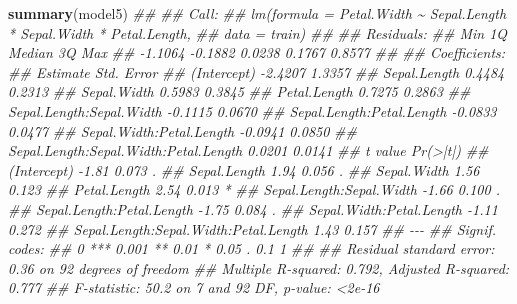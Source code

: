 \documentclass[
  notitlepage]{book}
\newenvironment{Shaded}{\begin{snugshade}}{\end{snugshade}}
\newcommand{\CommentTok}[1]{\textcolor[rgb]{0.56,0.35,0.01}{\textit{#1}}}
\newcommand{\KeywordTok}[1]{\textcolor[rgb]{0.13,0.29,0.53}{\textbf{#1}}}
\newcommand{\NormalTok}[1]{#1}
\begin{document}
\begin{Shaded}
\begin{Highlighting}[]
\KeywordTok{summary}\NormalTok{(model5)}
\CommentTok{\#\# }
\CommentTok{\#\# Call:}
\CommentTok{\#\# lm(formula = Petal.Width \textasciitilde{} Sepal.Length * Sepal.Width * Petal.Length, }
\CommentTok{\#\#     data = train)}
\CommentTok{\#\# }
\CommentTok{\#\# Residuals:}
\CommentTok{\#\#     Min      1Q  Median      3Q     Max }
\CommentTok{\#\# {-}1.1064 {-}0.1882  0.0238  0.1767  0.8577 }
\CommentTok{\#\# }
\CommentTok{\#\# Coefficients:}
\CommentTok{\#\#                                       Estimate Std. Error}
\CommentTok{\#\# (Intercept)                            {-}2.4207     1.3357}
\CommentTok{\#\# Sepal.Length                            0.4484     0.2313}
\CommentTok{\#\# Sepal.Width                             0.5983     0.3845}
\CommentTok{\#\# Petal.Length                            0.7275     0.2863}
\CommentTok{\#\# Sepal.Length:Sepal.Width               {-}0.1115     0.0670}
\CommentTok{\#\# Sepal.Length:Petal.Length              {-}0.0833     0.0477}
\CommentTok{\#\# Sepal.Width:Petal.Length               {-}0.0941     0.0850}
\CommentTok{\#\# Sepal.Length:Sepal.Width:Petal.Length   0.0201     0.0141}
\CommentTok{\#\#                                       t value Pr(\textgreater{}|t|)  }
\CommentTok{\#\# (Intercept)                             {-}1.81    0.073 .}
\CommentTok{\#\# Sepal.Length                             1.94    0.056 .}
\CommentTok{\#\# Sepal.Width                              1.56    0.123  }
\CommentTok{\#\# Petal.Length                             2.54    0.013 *}
\CommentTok{\#\# Sepal.Length:Sepal.Width                {-}1.66    0.100 .}
\CommentTok{\#\# Sepal.Length:Petal.Length               {-}1.75    0.084 .}
\CommentTok{\#\# Sepal.Width:Petal.Length                {-}1.11    0.272  }
\CommentTok{\#\# Sepal.Length:Sepal.Width:Petal.Length    1.43    0.157  }
\CommentTok{\#\# {-}{-}{-}}
\CommentTok{\#\# Signif. codes:  }
\CommentTok{\#\# 0 \textquotesingle{}***\textquotesingle{} 0.001 \textquotesingle{}**\textquotesingle{} 0.01 \textquotesingle{}*\textquotesingle{} 0.05 \textquotesingle{}.\textquotesingle{} 0.1 \textquotesingle{} \textquotesingle{} 1}
\CommentTok{\#\# }
\CommentTok{\#\# Residual standard error: 0.36 on 92 degrees of freedom}
\CommentTok{\#\# Multiple R{-}squared:  0.792,  Adjusted R{-}squared:  0.777 }
\CommentTok{\#\# F{-}statistic: 50.2 on 7 and 92 DF,  p{-}value: \textless{}2e{-}16}
\end{Highlighting}
\end{Shaded}
\end{document}
